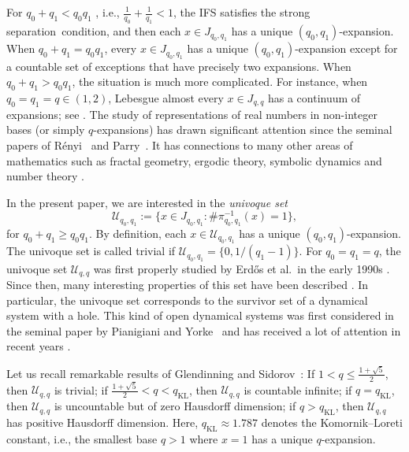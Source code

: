 \documentclass{amsart}
\theoremstyle{definition}
\numberwithin{equation}{section}
\newcommand{\cU}{\mathcal{U}}
\begin{document}
For $q_0 {+} q_1 < q_0q_1$ , i.e., $\frac{1}{q_0} {+} \frac{1}{q_1} < 1$, the IFS satisfies the strong separation~condition, and then each $x\in J_{q_0, q_1}$ has a unique $(q_0, q_1)$-expansion. 
When $q_0 {+} q_1 = q_0q_1$, every $x \in J_{q_0, q_1}$ has a unique $(q_0, q_1)$-expansion except for a countable set of exceptions that have precisely two expansions. 
When $q_0 {+} q_1 > q_0q_1$, the situation is much more complicated. 
For instance, when $q_0 = q_1 = q \in (1,2)$, Lebesgue almost every $x \in J_{q,q}$ has a continuum of expansions; see \cite{DajdeV2007,Sid2003,Sid2007}. 
The study of representations of real numbers in non-integer bases (or simply $q$-expansions) has drawn significant attention since the seminal papers of R\'enyi~\cite{Ren1957} and Parry~\cite{Par1960}.
It has connections to many other areas of mathematics such as fractal geometry, ergodic theory, symbolic dynamics and number theory \cite{AlcBarBakKon2019,All2017,AllBakKong2019,AllKong2019,AllKong2021a,AllKong2021b,AllKong2023,AllKong2024,BakKon2020,BoyDecHal2016,Cla2016,DajdeV2007,DeVKom2009,KalKonLiLu2019,KalSte2012,KomKonLi2017,KomSteZou2022,KongLi2015}.

In the present paper, we are interested in the \emph{univoque set}
\[
\cU_{q_0, q_1} := \big\{x\in J_{q_0, q_1}: \#\pi_{q_0, q_1}^{-1}(x)=1\big\},
\]
for $q_0{+}q_1\geq q_0q_1$.
By definition, each $x\in \cU_{q_0,q_1}$ has a unique $(q_0, q_1)$-expansion. 
The univoque set is called trivial if $\cU_{q_0, q_1}=\{0, 1/(q_1{-}1)\}$.
For $q_0 = q_1 = q$, the univoque set $\cU_{q, q}$ was first properly studied by Erd\H{o}s et al.\ in the early 1990s \cite{ErdHorJoo1991,ErdJoo1992a,ErdJooKom1990}. 
Since then, many interesting properties of this set have been described \cite{KomLor1998, DeVKom2009, Bak2014, All2017,   AllKong2021a,AllKong2021b,ZouLiLuKom2021,DevKomLor2022}. 
In particular, the univoque set corresponds to the survivor set of a dynamical system with a hole.
This kind of open dynamical systems was first considered in the seminal paper by Pianigiani and Yorke~\cite{PiaYor1979} and has received a lot of attention in recent years \cite{Alc2014, GleSid2015, Cla2016, BakKon2020, KalKonLanLi2020, AllKong2023, AllKong2024}.

Let us recall remarkable results of Glendinning and Sidorov~\cite{GleSid2001}: If $1 < q \le \frac{1+\sqrt{5}}{2}$, then $\cU_{q,q}$ is trivial; if $\frac{1+\sqrt{5}}{2} < q < q_{\mathrm{KL}}$, then $\cU_{q,q}$ is countable infinite; if $q = q_{\mathrm{KL}}$, then $\cU_{q,q}$ is uncountable but of zero Hausdorff dimension; if $q > q_{\mathrm{KL}}$, then $\cU_{q,q}$ has positive Hausdorff dimension. Here, $q_{\mathrm{KL}}\approx 1.787$ denotes the Komornik--Loreti constant, i.e., the smallest base $q > 1$ where $x = 1$ has a unique $q$-expansion.
 
\end{document}
